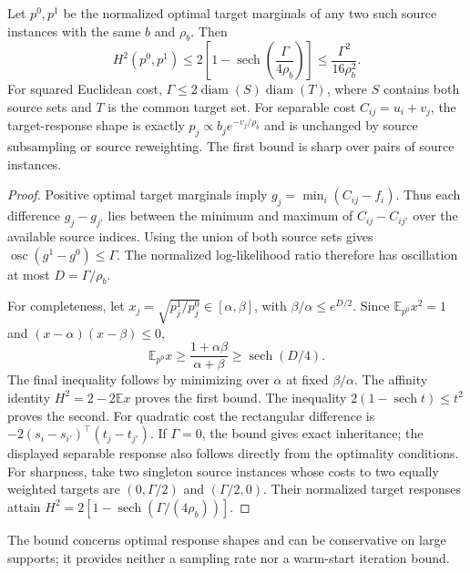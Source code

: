 \begin{proposition}
\label{prop:uot-hierarchy-stability}
\label{prop:uot-hierarchy-interaction}
Let $p^0,p^1$ be the normalized optimal target marginals of any two such source instances with the same $b$ and $\rho_b$.
Then
$$H^2(p^0,p^1)\leq2\left[1-\operatorname{sech}\!\left(\frac{\Gamma}{4\rho_b}\right)\right]\leq\frac{\Gamma^2}{16\rho_b^2}.$$
For squared Euclidean cost, $\Gamma\leq2\operatorname{diam}(S)\operatorname{diam}(T)$, where $S$ contains both source sets and $T$ is the common target set.
For separable cost $C_{ij}=u_i+v_j$, the target-response shape is exactly $p_j\propto b_j e^{-v_j/\rho_b}$ and is unchanged by source subsampling or source reweighting.
The first bound is sharp over pairs of source instances.
\end{proposition}
\begin{proof}
Positive optimal target marginals imply $g_j=\min_i(C_{ij}-f_i)$.
Thus each difference $g_j-g_{j'}$ lies between the minimum and maximum of $C_{ij}-C_{ij'}$ over the available source indices.
Using the union of both source sets gives $\operatorname{osc}(g^1-g^0)\leq\Gamma$.
The normalized log-likelihood ratio therefore has oscillation at most $D=\Gamma/\rho_b$.

For completeness, let $x_j=\sqrt{p^1_j/p^0_j}\in[\alpha,\beta]$, with $\beta/\alpha\leq e^{D/2}$.
Since $\mathbb E_{p^0}x^2=1$ and $(x-\alpha)(x-\beta)\leq0$,
$$\mathbb E_{p^0}x\geq\frac{1+\alpha\beta}{\alpha+\beta}\geq\operatorname{sech}(D/4).$$
The final inequality follows by minimizing over $\alpha$ at fixed $\beta/\alpha$.
The affinity identity $H^2=2-2\mathbb E x$ proves the first bound.
The inequality $2(1-\operatorname{sech} t)\leq t^2$ proves the second.
For quadratic cost the rectangular difference is $-2(s_i-s_{i'})^\top(t_j-t_{j'})$.
If $\Gamma=0$, the bound gives exact inheritance; the displayed separable response also follows directly from the optimality conditions.
For sharpness, take two singleton source instances whose costs to two equally weighted targets are $(0,\Gamma/2)$ and $(\Gamma/2,0)$.
Their normalized target responses attain $H^2=2[1-\operatorname{sech}(\Gamma/(4\rho_b))]$.
\end{proof}

The bound concerns optimal response shapes and can be conservative on large supports; it provides neither a sampling rate nor a warm-start iteration bound.

